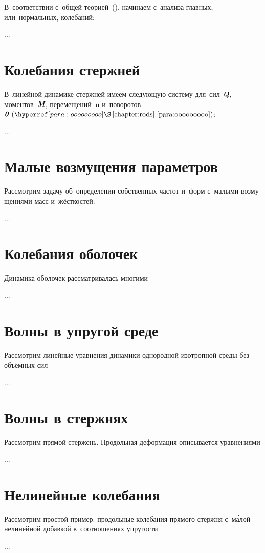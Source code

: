 \begin{otherlanguage}{russian}
\vspace{.2em} В~соответствии с~общей теорией~(), начинаем с~анализа главных, или~нормальных, колебаний:

...




\section{Колебания стержней}

В~линейной динамике стержней имеем следующую систему для~сил~$\mathboldQ$, моментов~$\mathboldM$, перемещений~$\bm{u}$ и~поворотов~$\bm{\theta}~(\chapdotpararef{chapter:rods}{para:ooooooooo})$:

...




\section{Малые возмущения параметров}

Рассмотрим задачу об~определении собственных частот и~форм с~малыми возмущениями масс и~жёсткостей:

...




\section{Колебания оболочек}

Динамика оболочек рассматривалась многими

...




\section{Волны в упругой среде}

Рассмотрим линейные уравнения динамики однородной изотропной среды без объёмных сил

...




\section{Волны в стержнях}

Рассмотрим прямой стержень. Продольная деформация описывается уравнениями

...




\section{Нелинейные колебания}

Рассмотрим простой пример: продольные колебания прямого стержня с~м\'{а}лой нелинейной добавкой в~соотношениях упругости

...




\end{otherlanguage}

